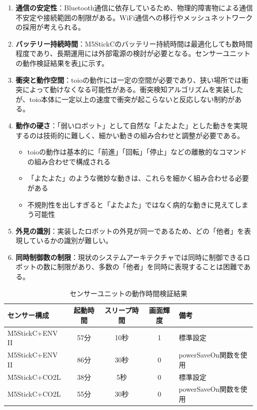 \documentclass{cuxarticle}
\begin{document}
\begin{enumerate}
  \item \textbf{通信の安定性}：Bluetooth通信に依存しているため、物理的障害物による通信不安定や接続範囲の制限がある。WiFi通信への移行やメッシュネットワークの採用が考えられる。

  \item \textbf{バッテリー持続時間}：M5StickCのバッテリー持続時間は最適化しても数時間程度であり、長期運用には外部電源の検討が必要となる。センサーユニットの動作検証結果を表\ref{table:battery}に示す。

  \item \textbf{衝突と動作空間}：toioの動作には一定の空間が必要であり、狭い場所では衝突によって動けなくなる可能性がある。衝突検知アルゴリズムを実装したが、toio本体に一定以上の速度で衝突が起こらないと反応しない制約がある。

  \item \textbf{動作の硬さ}：「弱いロボット」として自然な「よたよた」とした動きを実現するのは技術的に難しく、細かい動きの組み合わせと調整が必要である。
    \begin{itemize}
      \item toioの動作は基本的に「前進」「回転」「停止」などの離散的なコマンドの組み合わせで構成される
      \item 「よたよた」のような微妙な動きは、これらを細かく組み合わせる必要がある
      \item 不規則性を出しすぎると「よたよた」ではなく病的な動きに見えてしまう可能性
    \end{itemize}

  \item \textbf{外見の識別}：実装したロボットの外見が同一であるため、どの「他者」を表現しているかの識別が難しい。

  \item \textbf{同時制御数の制限}：現状のシステムアーキテクチャでは同時に制御できるロボットの数に制限があり、多数の「他者」を同時に表現することは困難である。
\end{enumerate}

\begin{table}[htbp]
  \caption{センサーユニットの動作時間検証結果}
  \label{table:battery}
  \centering
  \begin{tabular}{|l|c|c|c|l|}
    \hline
    センサー構成 & 起動時間 & スリープ時間 & 画面輝度 & 備考 \\
    \hline
    M5StickC+ENV II & 57分 & 10秒 & 1 & 標準設定 \\
    \hline
    M5StickC+ENV II & 86分 & 30秒 & 0 & powerSaveOn関数を使用 \\
    \hline
    M5StickC+CO2L & 38分 & 5秒 & 0 & 標準設定 \\
    \hline
    M5StickC+CO2L & 55分 & 30秒 & 0 & powerSaveOn関数を使用 \\
    \hline
  \end{tabular}
\end{table}
\end{document}
